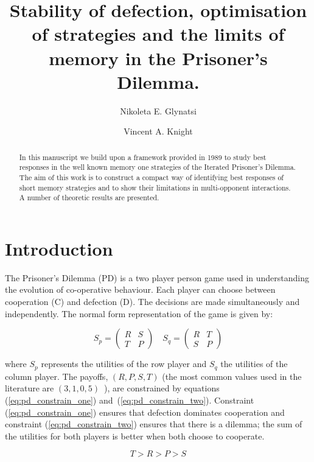 \documentclass[10pt]{article}
\title{Stability of defection, optimisation of strategies and the limits of memory in
the Prisoner's Dilemma.}
\author{Nikoleta E. Glynatsi \and Vincent A. Knight}
\date{}
\begin{document}
\maketitle

\begin{abstract}

In this manuscript we build upon a framework provided in 1989 to study best
responses in the well known memory one strategies of the Iterated Prisoner's
Dilemma. The aim of this work is to construct a compact way of identifying best
responses of short memory strategies and to show their limitations in multi-opponent
interactions. A number of theoretic results are presented. %
\end{abstract}

\section{Introduction}\label{section:introduction}

The Prisoner's Dilemma (PD) is a two player person game used in understanding the
evolution of co-operative behaviour. Each player can choose between cooperation
(C) and defection (D). The decisions are made simultaneously and independently.
The normal form representation of the game is given by:

\begin{equation}\label{equ:pd_definition}
    S_p = \begin{pmatrix}
    R & S  \\
    T & P
    \end{pmatrix} \quad
    S_q = \begin{pmatrix}
        R & T  \\
        S & P
        \end{pmatrix}
\end{equation}

where \(S_p\) represents the utilities of the row player and \(S_q\) the utilities
of the column player. The payoffs, \((R, P, S, T)\) (the most common values used in the
literature are \((3, 1, 0, 5)\)~\cite{Axelrod1981}), are constrained by equations
(\ref{eq:pd_constrain_one}) and~(\ref{eq:pd_constrain_two}). Constraint
(\ref{eq:pd_constrain_one}) ensures that defection dominates cooperation and
constraint (\ref{eq:pd_constrain_two}) ensures that there is a dilemma; the sum of the
utilities for both players is better when both choose to cooperate.

\begin{equation}\label{eq:pd_constrain_one}
    T > R > P > S 
\end{equation}
\end{document}
